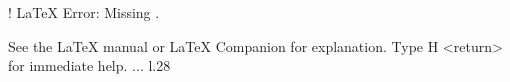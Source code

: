 \relax 
! LaTeX Error: Missing .

See the LaTeX manual or LaTeX Companion for explanation.
Type  H <return>  for immediate help. ...                                                                                                l.28                    \providecommand\hyper@newdestlabel[2]{}
\providecommand*\new@tpo@label[2]{}
